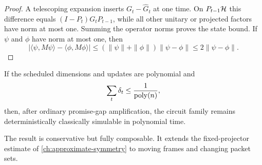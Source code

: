 \begin{proof}
A telescoping expansion inserts $G_t-\widehat G_t$ at one time. On $P_{t-1}\mathcal H$ this difference equals $(I-P_t)G_tP_{t-1}$, while all other unitary or projected factors have norm at most one. Summing the operator norms proves the state bound. If $\psi$ and $\phi$ have norm at most one, then
\[
|\langle\psi,M\psi\rangle-\langle\phi,M\phi\rangle|
\le
(\|\psi\|+\|\phi\|)\|\psi-\phi\|
\le2\|\psi-\phi\|.
\]
\end{proof}

\begin{corollary}
If the scheduled dimensions and updates are polynomial and
\[
\sum_t\delta_t\le\frac1{\operatorname{poly}(n)},
\]
then, after ordinary promise-gap amplification, the circuit family remains deterministically classically simulable in polynomial time.
\end{corollary}

The result is conservative but fully composable. It extends the fixed-projector estimate of \cref{ch:approximate-symmetry} to moving frames and changing packet sets.
